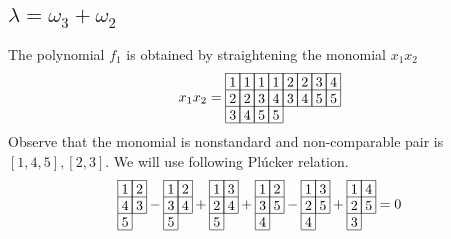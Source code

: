 \subsection{$\lambda=\omega_3+\omega_2$}
\label{sec:fv_hb40}
The polynomial \(f_1\) is obtained by straightening the monomial \(x_1x_2\)
\[
x_1x_2 = 
\begin{array}[c]{*{8}c}\cline{1-8}
\lr{1}&\lr{1}&\lr{1}&\lr{1}&\lr{2}&\lr{2}&\lr{3}&\lr{4}\\\cline{1-8}
\lr{2}&\lr{2}&\lr{3}&\lr{4}&\lr{3}&\lr{4}&\lr{5}&\lr{5}\\\cline{1-8}
\lr{3}&\lr{4}&\lr{5}&\lr{5}\\\cline{1-4}
\end{array}
\]
Observe that the monomial is nonstandard and non-comparable pair is \([1,4,5],[2,3]\). We will use following Pl\'{u}cker relation.
\[
\begin{array}[c]{*{2}c}\cline{1-2}
\lr{1}&\lr{2}\\\cline{1-2}
\lr{4}&\lr{3}\\\cline{1-2}
\lr{5}\\\cline{1-1}
\end{array}
-\begin{array}[c]{*{2}c}\cline{1-2}
\lr{1}&\lr{2}\\\cline{1-2}
\lr{3}&\lr{4}\\\cline{1-2}
\lr{5}\\\cline{1-1}
\end{array}
+\begin{array}[c]{*{2}c}\cline{1-2}
\lr{1}&\lr{3}\\\cline{1-2}
\lr{2}&\lr{4}\\\cline{1-2}
\lr{5}\\\cline{1-1}
\end{array}
+\begin{array}[c]{*{2}c}\cline{1-2}
\lr{1}&\lr{2}\\\cline{1-2}
\lr{3}&\lr{5}\\\cline{1-2}
\lr{4}\\\cline{1-1}
\end{array}
-\begin{array}[c]{*{2}c}\cline{1-2}
\lr{1}&\lr{3}\\\cline{1-2}
\lr{2}&\lr{5}\\\cline{1-2}
\lr{4}\\\cline{1-1}
\end{array}
+\begin{array}[c]{*{2}c}\cline{1-2}
\lr{1}&\lr{4}\\\cline{1-2}
\lr{2}&\lr{5}\\\cline{1-2}
\lr{3}\\\cline{1-1}
\end{array}
=0
\]
